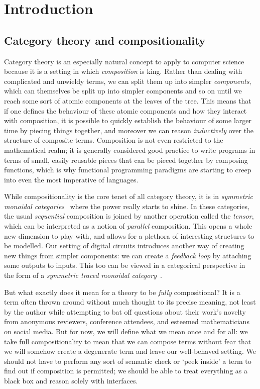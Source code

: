 \chapter{Introduction}




\section{Category theory and compositionality}



Category theory is an especially natural concept to apply to computer science
because it is a setting in which \emph{composition} is king.
Rather than dealing with complicated and unwieldy terms, we can split them
up into simpler \emph{components}, which can themselves be split up into simpler
components and so on until we reach some sort of atomic components at the leaves
of the tree.
This means that if one defines the behaviour of these atomic components and
how they interact with composition, it is possible to quickly establish the
behaviour of some larger time by piecing things together, and moreover we can
reason \emph{inductively} over the structure of composite terms.
Composition is not even restricted to the mathematical realm; it is generally
considered good practice to write programs in terms of small, easily reusable
pieces that can be pieced together by composing functions, which is why
functional programming paradigms are starting to creep into even the most
imperative of languages.

While compositionality is the core tenet of all category theory, it is in
\emph{symmetric monoidal categories}~\cite{maclane1963natural} where the power
really starts to shine.
In these categories, the usual \emph{sequential} composition is joined by
another operation called the \emph{tensor}, which can be interpreted as a notion
of \emph{parallel} composition.
This opens a whole new dimension to play with, and allows for a plethora of
interesting structures to be modelled.
Our setting of digital circuits introduces another way of creating new things
from simpler components: we can create a \emph{feedback loop} by attaching some
outputs to inputs.
This too can be viewed in a categorical perspective in the form of a
\emph{symmetric traced monoidal category}~\cite{joyal1996traced}.

But what exactly does it mean for a theory to be \emph{fully} compositional?
It is a term often thrown around without much thought to its precise meaning,
not least by the author while attempting to bat off questions about their work's
novelty from anonymous reviewers, conference attendees, and esteemed
mathematicians on social media.
But for now, we will define what we mean once and for all: we take full
compositionality to mean that we can compose terms without fear that we will
somehow create a degenerate term and leave our well-behaved setting.
We should not have to perform any sort of semantic check or `peek inside' a term
to find out if composition is permitted; we should be able to treat everything
as a black box and reason solely with interfaces.

